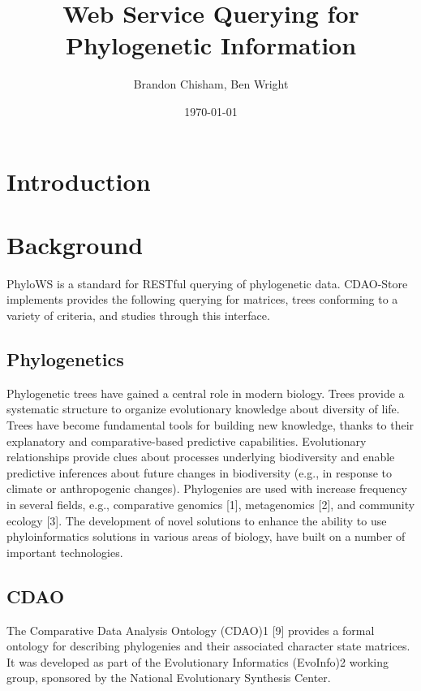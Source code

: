 \documentclass[10pt]{article}
\author{Brandon Chisham, Ben Wright}
\title{Web Service Querying for Phylogenetic Information}
\date{\today}
\begin{document}
\maketitle

\section{Introduction}

\section{Background}
PhyloWS is a standard for RESTful querying of phylogenetic data. CDAO-Store implements provides the following querying for matrices, trees conforming to a variety of criteria, and studies through this interface.

\subsection{Phylogenetics}
Phylogenetic trees have gained a central role in modern biology. Trees provide a systematic structure to organize evolutionary knowledge about diversity of life. Trees have become fundamental tools for building new knowledge, thanks to their explanatory and comparative-based predictive capabilities.
Evolutionary relationships provide clues about processes underlying biodiversity and enable predictive inferences about future changes in biodiversity (e.g., in response to climate or anthropogenic changes).  Phylogenies are used with increase frequency in several fields, e.g., comparative genomics [1], metagenomics [2], and community ecology [3].  The development of novel solutions to enhance the ability to use phyloinformatics solutions in various areas of biology, have built on a number of important technologies.

\subsection{CDAO}
The Comparative Data Analysis Ontology (CDAO)1 [9] provides a formal ontology for describing phylogenies and their associated character state matrices.  It was developed as part of the Evolutionary Informatics (EvoInfo)2 working group, sponsored by the National Evolutionary Synthesis Center.
\end{document}
